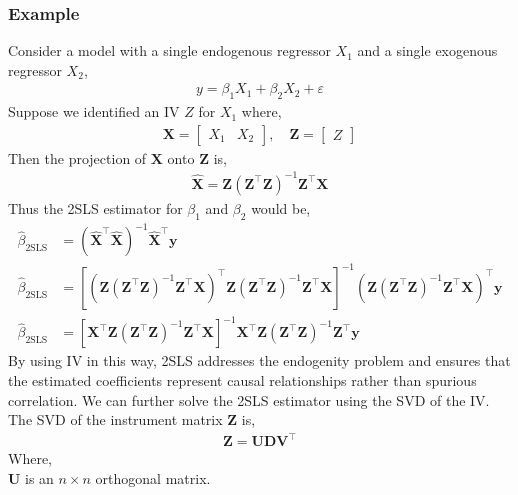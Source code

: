 \subsubsection{Example}
Consider a model with a single endogenous regressor \(X_1\) and a single exogenous regressor \(X_2\),
\begin{align}
y = \beta_1 X_1 + \beta_2 X_2 + \varepsilon
\end{align}
Suppose we identified an IV \(Z\) for \(X_1\) where,
\begin{align}
\mathbf{X} = \begin{bmatrix} X_1 & X_2 \end{bmatrix}, \quad \mathbf{Z} = \begin{bmatrix} Z \end{bmatrix}
\end{align}
Then the projection of \(\mathbf{X}\) onto \(\mathbf{Z}\) is,
\begin{align}
\hat{\mathbf{X}} = \mathbf{Z}(\mathbf{Z}^\top \mathbf{Z})^{-1}\mathbf{Z}^\top \mathbf{X}
\end{align}
Thus the 2SLS estimator for \(\beta_1\) and \(\beta_2\) would be,
\begin{align}
\hat{\beta}_{\text{2SLS}} &= \left(\hat{\mathbf{X}}^\top \hat{\mathbf{X}}\right)^{-1} \hat{\mathbf{X}}^\top \mathbf{y} \\
\hat{\beta}_{\text{2SLS}} &= \left[\left(\mathbf{Z}(\mathbf{Z}^\top \mathbf{Z})^{-1} \mathbf{Z}^\top \mathbf{X}\right)^\top \mathbf{Z}(\mathbf{Z}^\top \mathbf{Z})^{-1} \mathbf{Z}^\top \mathbf{X}\right]^{-1} \left(\mathbf{Z}(\mathbf{Z}^\top \mathbf{Z})^{-1} \mathbf{Z}^\top \mathbf{X}\right)^\top \mathbf{y} \\
\hat{\beta}_{\text{2SLS}} &= \left[\mathbf{X}^\top \mathbf{Z} (\mathbf{Z}^\top \mathbf{Z})^{-1} \mathbf{Z}^\top \mathbf{X}\right]^{-1} \mathbf{X}^\top \mathbf{Z} (\mathbf{Z}^\top \mathbf{Z})^{-1} \mathbf{Z}^\top \mathbf{y}
\end{align}
By using IV in this way, 2SLS addresses the endogenity problem and ensures that the estimated coefficients represent causal relationships rather than spurious correlation.
We can further solve the 2SLS estimator using the SVD of the IV. The SVD of the instrument matrix \(\mathbf{Z}\) is,
\begin{align}
\mathbf{Z} = \mathbf{U} \mathbf{D} \mathbf{V}^\top
\end{align}
Where, \\
\(\mathbf{U}\) is an \(n \times n\) orthogonal matrix. \\
